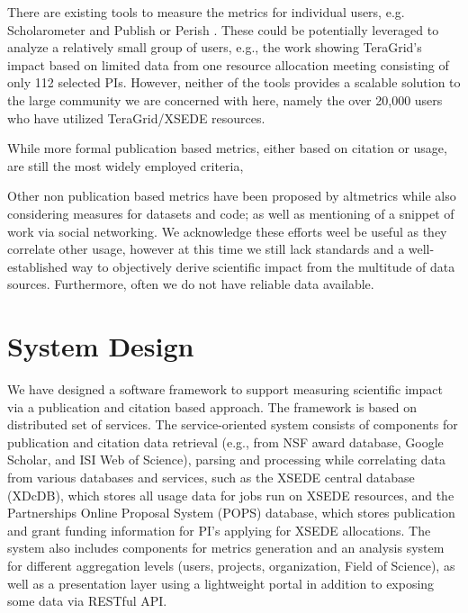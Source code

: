 \documentclass{sig-alternate}
\begin{document}
There are existing tools to measure the metrics for individual users,
e.g. Scholarometer \cite{kaur2012scholarometer} and Publish or Perish
\cite{www-pop}. These could be potentially leveraged to analyze a
relatively small group of users, e.g., the work \cite{bollen2011and}
showing TeraGrid's impact based on limited data from one resource
allocation meeting consisting of only 112 selected PIs.  However, neither
of the tools provides a scalable solution to the large community we
are concerned with here, namely the over 20,000 users who have utilized
TeraGrid/XSEDE resources.
 
While more formal publication based metrics, either based on citation
or usage, are still the most widely employed criteria, 

Other non publication based metrics have been proposed by altmetrics
\cite{www-altmetrics} while also considering measures for datasets and
code; as well as mentioning of a snippet of work via social
networking. We acknowledge these efforts weel be useful as they
correlate other usage, however at this time we still 
lack standards and a well-established way to objectively derive
scientific impact from the multitude of data sources. Furthermore,
often we do not have reliable data available.



\section{System Design} \label{S:design}
 
We have designed a software framework to support measuring scientific
impact via a publication and citation based approach. The framework is
based on distributed set of services. The service-oriented system
consists of components for publication and citation data retrieval
(e.g., from NSF award database, Google Scholar, and ISI Web of
Science), parsing and processing while correlating data from various
databases and services, such as the XSEDE central database (XDcDB),
which stores all usage data for jobs run on XSEDE resources, and the
Partnerships Online Proposal System (POPS) database, which stores
publication and grant funding information for PI's applying for XSEDE
allocations. The system also includes components for metrics
generation and an analysis system for different aggregation levels
(users, projects, organization, Field of Science), as well as a
presentation layer using a lightweight portal in addition to exposing
some data via RESTful API.
\end{document}
